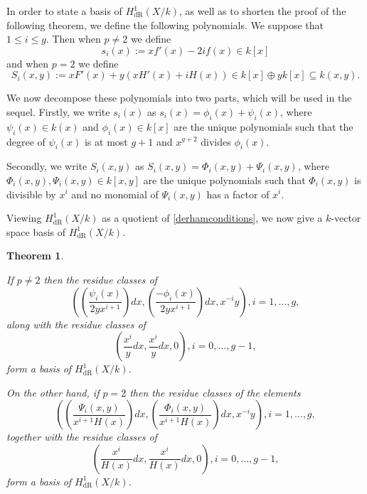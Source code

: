 \documentclass[draft, 11pt]{article} %
\theoremstyle{plain}
\newtheorem{thm}[defn]{Theorem}
\theoremstyle{remark}
\newcommand{\derhamhone}{H_{\text {dR}}^1(X/k)}
\begin{document}
In order to state a basis of $\derhamhone$, as well as to shorten the proof of the following theorem, we define the following polynomials. 
We suppose that $1 \leq i \leq g$.
Then when $p\neq 2$ we define
\[
s_i(x) := xf'(x) - 2if(x) \in k[x]
\]
and when $p = 2$ we define
\begin{equation}\label{capitals}
S_i(x,y) := xF'(x) + y(xH'(x) + iH(x))\in k[x]\oplus yk[x] \subseteq k(x,y).
\end{equation}

We now decompose these polynomials into two parts, which will be used in the sequel.
Firstly, we write $s_i(x)$ as $s_i(x) = \phi_i(x) + \psi_i(x)$, where $\psi_i(x)\in k(x)$ and $\phi_i(x) \in k[x]$ are the unique polynomials such that the degree of $\psi_i (x)$ is at most $g+1$ and $x^{g+2}$ divides $\phi_i(x)$.


Secondly, we write $S_i(x,y)$ as $S_i(x,y) = \Phi_i(x,y) + \Psi_i(x,y)$, where $\Phi_i(x,y), \Psi_i(x,y) \in k[x,y]$ are the unique polynomials such that $\Phi_i(x,y)$ is divisible by $x^i$ and no monomial of $\Psi_i(x,y)$ has a factor of $x^i$.

Viewing $\derhamhone$ as a quotient of \eqref{derhamconditions}, we now give a $k$-vector space basis of $\derhamhone$.
\begin{thm}\label{basis}

If $p \neq 2$ then the residue classes of 
\begin{equation}\label{one}
 \left( \left( \frac{\psi_i(x)}{2yx^{i+1}}\right) dx, \left(\frac{-\phi_i(x)}{2yx^{i+1}}\right) dx, x^{-i}y\right), i=1, \ldots ,g,
\end{equation}
along with the residue classes of 
\begin{equation}\label{two}
 \left( \frac{x^{i}}{y} dx , \frac{x^{i}}{y} dx, 0 \right), i = 0,\ldots ,g-1,
\end{equation}
form a basis of $\derhamhone$.

On the other hand, if $p=2$ then the residue classes of the elements 
\begin{equation}\label{three}
\left( \left(\frac{\Psi_i(x,y)}{x^{i+1}H(x)}\right) dx, \left( \frac{\Phi_i(x,y)}{x^{i+1}H(x)} \right) dx, x^{-i}y \right), i =1, \ldots , g,
\end{equation}
together with the residue classes of 
\begin{equation}\label{four}
\left( \frac{x^{i}}{H(x)} dx, \frac{x^{i}}{H(x)} dx, 0 \right), i=0, \ldots, g-1,
\end{equation}
form a basis of $\derhamhone$.
\end{thm}
\end{document}
